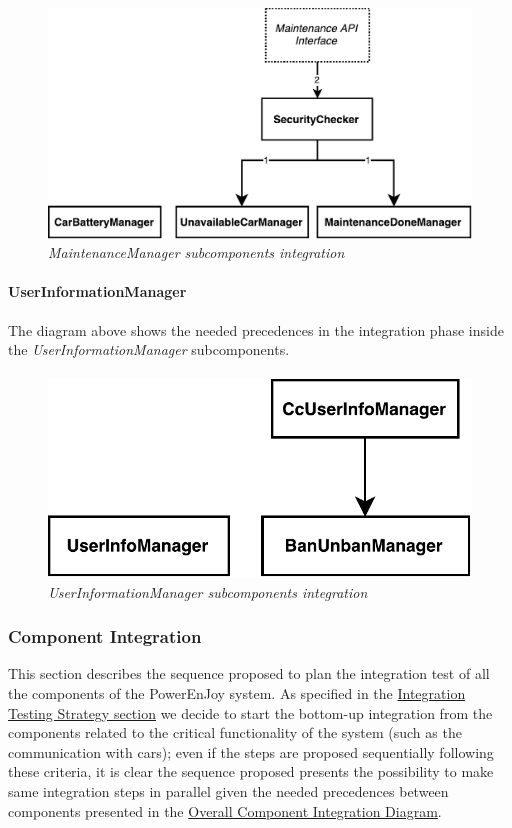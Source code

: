 		\begin{figure}[h]
			\centering
			\includegraphics[width=0.6\linewidth]{img/maintenanceIntegration}
			\caption{
				\label{fig:maintenanceIntegration} 
				\emph{MaintenanceManager subcomponents integration}
			}
		\end{figure}
		
\paragraph{UserInformationManager} 
The diagram above shows the needed precedences in the integration phase inside the \emph{UserInformationManager} subcomponents.
\paragraph{}

		\begin{figure}[h]
			\centering
			\includegraphics[width=0.4\linewidth]{img/userIntegration}
			\caption{
				\label{fig:userIntegration} 
				\emph{UserInformationManager subcomponents integration}
			}
		\end{figure}

\subsubsection{Component Integration}
This section describes the sequence proposed to plan the integration test of all the components of the PowerEnJoy system. As specified in the \hyperref[sec:intStrategy]{Integration Testing Strategy section} we decide to start the bottom-up integration from the components related to the critical functionality of the system (such as the communication with cars); even if the steps are proposed sequentially following these criteria, it is clear the sequence proposed presents the possibility to make same integration steps in parallel given the needed precedences between components presented in the \hyperref[sec:overallPrecedences]{Overall Component Integration Diagram}.

